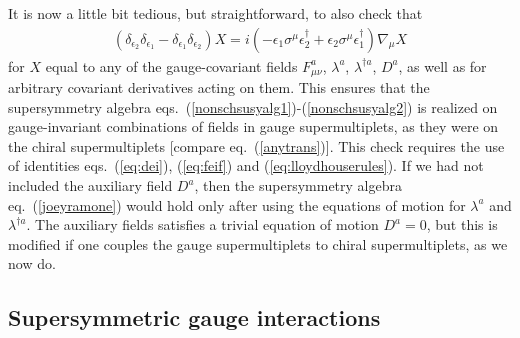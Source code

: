 \documentclass[11pt]{article}
\renewcommand{\theequation}{\arabic{section}.\arabic{equation}}
\def\beq{\begin{eqnarray}}
\def\eeq{\end{eqnarray}}
\begin{document}
It is now a little bit tedious, but straightforward, to also check that
\beq
(\delta_{\epsilon_2} \delta_{\epsilon_1} -\delta_{\epsilon_1}
\delta_{\epsilon_2} ) X = 
i (-\epsilon_1\sigma^\mu \epsilon_2^\dagger
+\epsilon_2\sigma^\mu \epsilon_1^\dagger) \nabla_\mu X
\label{joeyramone}
\eeq
for $X$ equal to any of the gauge-covariant fields $F_{\mu\nu}^a$,
$\lambda^a$, $\lambda^{\dagger a}$, $D^a$, as well as for arbitrary
covariant derivatives acting on them. This ensures that the supersymmetry
algebra eqs.~(\ref{nonschsusyalg1})-(\ref{nonschsusyalg2}) is realized on
gauge-invariant combinations of fields in gauge supermultiplets, as they
were on the chiral supermultiplets [compare eq.~(\ref{anytrans})]. This
check requires the use of identities 
eqs.~(\ref{eq:dei}), (\ref{eq:feif}) and (\ref{eq:lloydhouserules}).
If we had not included the auxiliary field
$D^a$, then the supersymmetry algebra eq.~(\ref{joeyramone}) would hold
only after using the equations of motion for $\lambda^a$ and
$\lambda^{\dagger a}$. The auxiliary fields satisfies a trivial equation
of motion $D^a=0$, but this is modified if one couples the gauge
supermultiplets to chiral supermultiplets, as we now do. 

\subsection{Supersymmetric gauge
interactions}\label{subsec:susylagr.gaugeinter}
\setcounter{footnote}{1}
\renewcommand{\theequation}{\arabic{section}.\arabic{subsection}.\arabic{equation}}
\setcounter{equation}{0}
\end{document}
